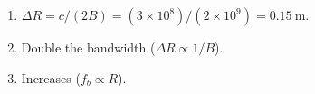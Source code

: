 \begin{enumerate}[leftmargin=1.6em,itemsep=2pt]
\item $\Delta R = c/(2B) = (3\times10^8)/(2\times10^9) = 0.15\ \text{m}$.
\item Double the bandwidth ($\Delta R \propto 1/B$).
\item Increases ($f_b \propto R$).
\end{enumerate}
